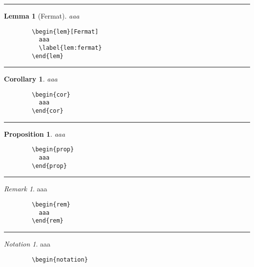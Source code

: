 \documentclass[a4paper,10pt,landscape]{article}
\newcommand{\hSep}{{\color{colorSep}\hrule}}
\newtheorem{cor}[thm]{Corollary}
\newtheorem{lem}[thm]{Lemma}
\newtheorem{prop}[thm]{Proposition}
\theoremstyle{definition}
\theoremstyle{remark}
\newtheorem{rem}{Remark}[section]
\newtheorem*{notation}{Notation}
\begin{document}
\begin{multicols}{3}
\begin{multicols}{2}
\begin{verbatim}
	\end{verbatim}
\end{multicols}
\hSep
\begin{multicols}{2}
		\begin{lem}[Fermat]
		  aaa
		  \label{lem:fermat}
		\end{lem}
\columnbreak
	\begin{verbatim}
		\begin{lem}[Fermat]
		  aaa
		  \label{lem:fermat}
		\end{lem}
	\end{verbatim}
\end{multicols}
\hSep
\begin{multicols}{2}
		\begin{cor}
		  aaa
		\end{cor}
\columnbreak
	\begin{verbatim}
		\begin{cor}
		  aaa
		\end{cor}
	\end{verbatim}
\end{multicols}
\hSep
\begin{multicols}{2}
		\begin{prop}
		  aaa
		\end{prop}
\columnbreak
	\begin{verbatim}
		\begin{prop}
		  aaa
		\end{prop}
	\end{verbatim}
\end{multicols}
\hSep
\begin{multicols}{2}
		\begin{rem}
		  aaa
		\end{rem}
\columnbreak
	\begin{verbatim}
		\begin{rem}
		  aaa
		\end{rem}
	\end{verbatim}
\end{multicols}
\hSep
\begin{multicols}{2}
		\begin{notation}
		  aaa
		\end{notation}
\columnbreak
	\begin{verbatim}
		\begin{notation}

\end{verbatim}
\end{multicols}
\end{multicols}
\end{document}
